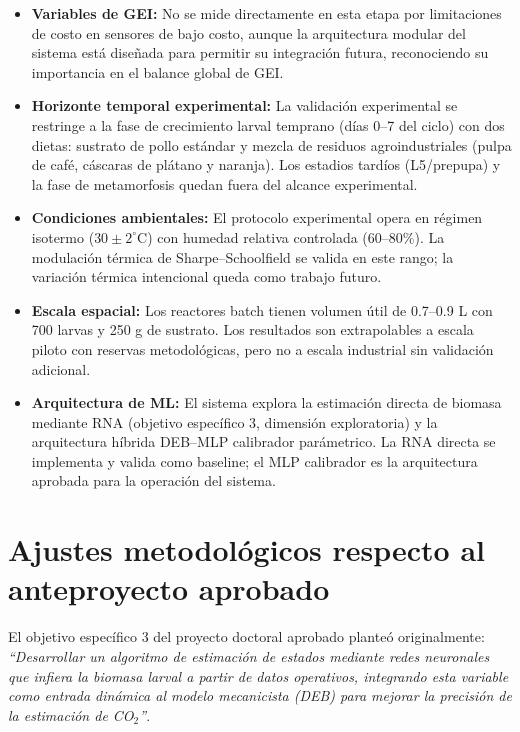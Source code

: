 \begin{itemize}
    \item \textbf{Variables de GEI:} No se mide directamente  en esta etapa por limitaciones de costo en sensores de bajo costo, aunque la arquitectura modular del sistema está diseñada para permitir su integración futura, reconociendo su importancia en el balance global de GEI.
    
    \item \textbf{Horizonte temporal experimental:} La validación experimental se restringe a la fase de crecimiento larval temprano (días 0--7 del ciclo) con dos dietas: sustrato de pollo estándar y mezcla de residuos agroindustriales (pulpa de café, cáscaras de plátano y naranja). Los estadios tardíos (L5/prepupa) y la fase de metamorfosis quedan fuera del alcance experimental.
    
    \item \textbf{Condiciones ambientales:} El protocolo experimental opera en régimen isotermo ($30 \pm 2^\circ\text{C}$) con humedad relativa controlada (60--80\%). La modulación térmica de Sharpe--Schoolfield se valida en este rango; la variación térmica intencional queda como trabajo futuro.
    
    \item \textbf{Escala espacial:} Los reactores batch tienen volumen útil de 0.7--0.9 L con 700 larvas y 250 g de sustrato. Los resultados son extrapolables a escala piloto con reservas metodológicas, pero no a escala industrial sin validación adicional.
    
    \item \textbf{Arquitectura de ML:} El sistema explora la estimación directa de biomasa mediante RNA (objetivo específico 3, dimensión exploratoria) y la arquitectura híbrida DEB--MLP calibrador parámetrico. La RNA directa se implementa y valida como baseline; el MLP calibrador es la arquitectura aprobada para la operación del sistema.
\end{itemize}

\section{Ajustes metodológicos respecto al anteproyecto aprobado}

El objetivo específico 3 del proyecto doctoral aprobado planteó originalmente: 
\textit{``Desarrollar un algoritmo de estimación de estados mediante redes neuronales 
que infiera la biomasa larval a partir de datos operativos, integrando esta variable 
como entrada dinámica al modelo mecanicista (DEB) para mejorar la precisión de la 
estimación de CO$_2$''}. 

